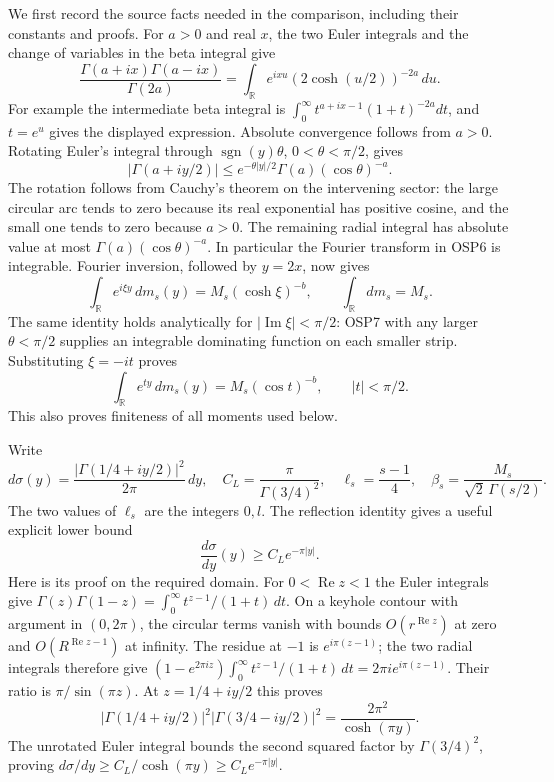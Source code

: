 \documentclass[11pt,a4paper]{article}
\begin{document}
We first record the source facts needed in the comparison, including
their constants and proofs. For $a>0$ and real $x$, the two Euler
integrals and the change of variables in the beta integral give
\[
\frac{\Gamma(a+ix)\Gamma(a-ix)}{\Gamma(2a)}
 =\int_{\mathbb R}e^{ixu}(2\cosh(u/2))^{-2a}\,du.
\tag{OSP6}
\]
For example the intermediate beta integral is
$\int_0^\infty t^{a+ix-1}(1+t)^{-2a}dt$, and $t=e^u$
gives the displayed expression. Absolute convergence follows from
$a>0$. Rotating Euler's integral through
$\operatorname{sgn}(y)\theta$, $0<\theta<\pi/2$, gives
\[
|\Gamma(a+iy/2)|
 \le e^{-\theta|y|/2}\Gamma(a)(\cos\theta)^{-a}.
\tag{OSP7}
\]
The rotation follows from Cauchy's theorem on the intervening
sector: the large circular arc tends to zero because its real
exponential has positive cosine, and the small one tends to zero
because $a>0$. The remaining radial integral has absolute value
at most $\Gamma(a)(\cos\theta)^{-a}$. In particular the Fourier
transform in OSP6 is integrable. Fourier inversion, followed by
$y=2x$, now gives
\[
\int_{\mathbb R}e^{i\xi y}\,dm_s(y)
  =M_s(\cosh\xi)^{-b},\qquad
\int_{\mathbb R}dm_s=M_s.
\tag{OSP8}
\]
The same identity holds analytically for $|\operatorname{Im}\xi|<\pi/2$:
OSP7 with any larger $\theta<\pi/2$ supplies an integrable dominating
function on each smaller strip. Substituting $\xi=-it$ proves
\[
\int_{\mathbb R}e^{ty}\,dm_s(y)=M_s(\cos t)^{-b},
\qquad |t|<\pi/2.
\tag{OSP9}
\]
This also proves finiteness of all moments used below.

Write
\[
d\sigma(y)=\frac{|\Gamma(1/4+iy/2)|^2}{2\pi}\,dy,\quad
C_L=\frac{\pi}{\Gamma(3/4)^2},\quad
\ell_s=\frac{s-1}{4},\quad
\beta_s=\frac{M_s}{\sqrt2\,\Gamma(s/2)}.
\tag{OSP10}
\]
The two values of $\ell_s$ are the integers $0,l$. The reflection
identity gives a useful explicit lower bound
\[
\frac{d\sigma}{dy}(y)\ge C_Le^{-\pi|y|}.
\tag{OSP11}
\]
Here is its proof on the required domain. For $0<\operatorname{Re}z<1$
the Euler integrals give
$\Gamma(z)\Gamma(1-z)=\int_0^\infty t^{z-1}/(1+t)\,dt$.
On a keyhole contour with argument in $(0,2\pi)$, the circular
terms vanish with bounds $O(r^{\operatorname{Re}z})$ at zero
and $O(R^{\operatorname{Re}z-1})$ at infinity. The residue at $-1$
is $e^{i\pi(z-1)}$; the two radial integrals therefore give
$(1-e^{2\pi iz})\int_0^\infty t^{z-1}/(1+t)\,dt
=2\pi i e^{i\pi(z-1)}$. Their ratio is $\pi/\sin(\pi z)$.
At $z=1/4+iy/2$ this proves
\[
|\Gamma(1/4+iy/2)|^2|\Gamma(3/4-iy/2)|^2
 =\frac{2\pi^2}{\cosh(\pi y)}.
\]
The unrotated Euler integral bounds the second squared factor by
$\Gamma(3/4)^2$, proving
$d\sigma/dy\ge C_L/\cosh(\pi y)\ge C_Le^{-\pi|y|}$.
\end{document}
